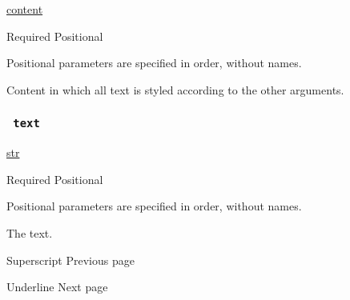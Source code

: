 \href{/docs/reference/foundations/content/}{content}

{Required} {{ Positional }}

\label{parameters-body-positional-tooltip}
Positional parameters are specified in order, without names.

Content in which all text is styled according to the other arguments.

\subsubsection{\texorpdfstring{\texttt{\ text\ }}{ text }}\label{parameters-text}

\href{/docs/reference/foundations/str/}{str}

{Required} {{ Positional }}

\label{parameters-text-positional-tooltip}
Positional parameters are specified in order, without names.

The text.

\href{/docs/reference/text/super/}{\pandocbounded{}}

{ Superscript } { Previous page }

\href{/docs/reference/text/underline/}{\pandocbounded{}}

{ Underline } { Next page }
